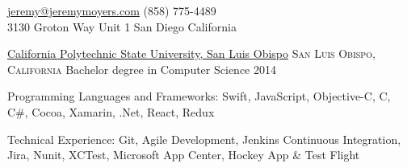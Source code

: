 \documentclass[10pt,a4paper]{article}
\begin{document}
\sloppy  %



\nobreakvspace{0.3em}  %

\noindent\href{mailto:jeremy.at.jeremymoyers.coml}{jeremy\mbox{}@\mbox{}jeremymoyers.com}\sbull
(858) 775-4489
\\
3130 Groton Way Unit 1\sbull
San Diego\thinspace {\large \sc }\sbull
California

\spacedhrule{0.9em}{-0.4em}  %


\headedsection
  {\href{https://www.calpoly.edu}{California Polytechnic State University, San Luis Obispo}}
  {\textsc{San Luis Obispo, California}} {%
  \headedsubsection
    {Bachelor degree in Computer Science}
    {2014}
    {\bodytext{}}
}
\vspace{-0.8em}


\spacedhrule{0.5em}{-0.4em}


\inlineheadsection  %
  {Programming Languages and Frameworks:}
  {Swift, JavaScript, Objective-C, C, C\#, Cocoa, Xamarin, .Net, React, Redux }

\vspace{0.2em}
\inlineheadsection
  {Technical Experience:}
  {Git, Agile Development, Jenkins Continuous Integration, Jira, Nunit, XCTest, Microsoft App Center, Hockey App \& Test Flight }


\spacedhrule{1.6em}{-0.4em}

\end{document}
